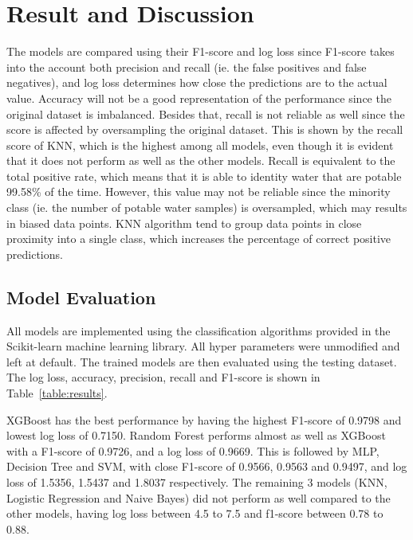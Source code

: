 \documentclass[conference]{IEEEtran}
\begin{document}
\section{Result and Discussion}
The models are compared using their F1-score and log loss since F1-score takes into the account both precision and recall (ie. the false positives and false negatives), and log loss determines how close the predictions are to the actual value. Accuracy will not be a good representation of the performance since the original dataset is imbalanced. Besides that, recall is not reliable as well since the score is affected by oversampling the original dataset. This is shown by the recall score of KNN, which is the highest among all models, even though it is evident that it does not perform as well as the other models. Recall is equivalent to the total positive rate, which means that it is able to identity water that are potable 99.58\% of the time. However, this value may not be reliable since the minority class (ie. the number of potable water samples) is oversampled, which may results in biased data points. KNN algorithm tend to group data points in close proximity into a single class, which increases the percentage of correct positive predictions. 

\subsection{Model Evaluation}
All models are implemented using the classification algorithms provided in the Scikit-learn machine learning library. All hyper parameters were unmodified and left at default. The trained models are then evaluated using the testing dataset. The log loss, accuracy, precision, recall and F1-score is shown in Table~\ref{table:results}. 

XGBoost has the best performance by having the highest F1-score of 0.9798 and lowest log loss of 0.7150. Random Forest performs almost as well as XGBoost with a F1-score of 0.9726, and a log loss of 0.9669. This is followed by MLP, Decision Tree and SVM, with close F1-score of 0.9566, 0.9563 and 0.9497, and log loss of 1.5356, 1.5437 and 1.8037 respectively. The remaining 3 models (KNN, Logistic Regression and Naive Bayes) did not perform as well compared to the other models, having log loss between 4.5 to 7.5 and f1-score between 0.78 to 0.88. 
\end{document}

